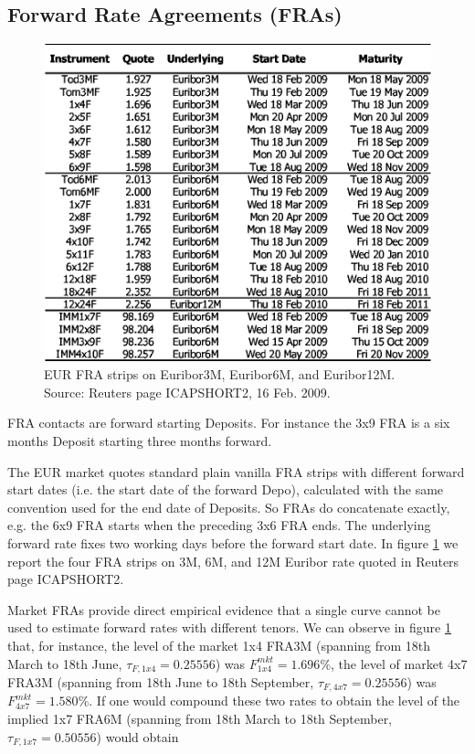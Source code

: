 \documentclass[11pt,reqno]{amsart}
\begin{document}
\subsection{Forward Rate Agreements (FRAs)}
\label{sec:FRA}
\begin{figure}[tbp]
\centering
\includegraphics[scale=0.9]{../figures/FigMktFRA}
\caption{EUR FRA strips on Euribor3M, Euribor6M, and Euribor12M. Source: Reuters page ICAPSHORT2, 16 Feb. 2009.}
\label{fig:FRA}
\end{figure}
FRA contacts are forward starting Deposits. For instance the 3x9 FRA is a six months Deposit starting three months forward.
\par
The EUR market quotes standard plain vanilla FRA strips with different forward start dates (i.e. the start date of the forward Depo), calculated with the same convention used for the end date of Deposits. So FRAs do concatenate exactly, e.g. the 6x9 FRA starts when the preceding 3x6 FRA ends. The underlying forward rate fixes two working days before the forward start date.
In figure \ref{fig:FRA} we report the four FRA strips on 3M, 6M, and 12M Euribor rate quoted in Reuters page ICAPSHORT2.
\par
Market FRAs provide direct empirical evidence that a single curve cannot be used to estimate forward rates with different tenors. We can observe in figure \ref{fig:FRA} that, for instance, the level of the market 1x4 FRA3M (spanning from 18th March to 18th June, $\tau_{F,1x4} = 0.25556$) was $F_{1x4}^{mkt} = 1.696\%$, the level of market 4x7 FRA3M (spanning from 18th June to 18th September, $\tau_{F,4x7} = 0.25556$) was $F_{4x7}^{mkt}=1.580\%$. If one would compound these two rates to obtain the level of the implied 1x7 FRA6M (spanning from 18th March to 18th September, $\tau_{F,1x7} = 0.50556$) would obtain
\end{document}
